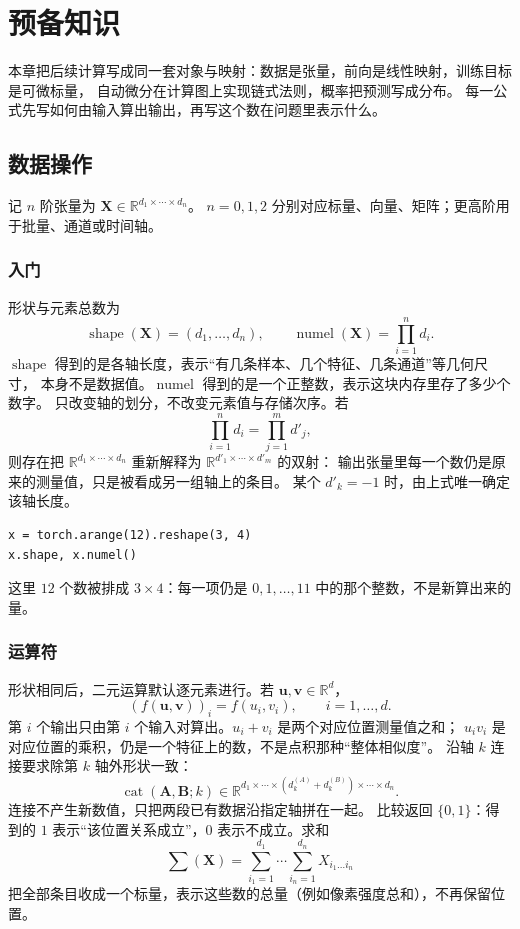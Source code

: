 \chapter{预备知识}

本章把后续计算写成同一套对象与映射：数据是张量，前向是线性映射，训练目标是可微标量，
自动微分在计算图上实现链式法则，概率把预测写成分布。
每一公式先写如何由输入算出输出，再写这个数在问题里表示什么。

\section{数据操作}

记 $n$ 阶张量为 $\bm{X}\in\mathbb{R}^{d_1\times\cdots\times d_n}$。
$n=0,1,2$ 分别对应标量、向量、矩阵；更高阶用于批量、通道或时间轴。

\subsection{入门}

形状与元素总数为
\[
\operatorname{shape}(\bm{X})=(d_1,\ldots,d_n),
\qquad
\operatorname{numel}(\bm{X})=\prod_{i=1}^{n}d_i.
\]
$\operatorname{shape}$ 得到的是各轴长度，表示“有几条样本、几个特征、几条通道”等几何尺寸，
本身不是数据值。$\operatorname{numel}$ 得到的是一个正整数，表示这块内存里存了多少个数字。
 只改变轴的划分，不改变元素值与存储次序。若
\[
\prod_{i=1}^{n}d_i=\prod_{j=1}^{m}d'_j,
\]
则存在把 $\mathbb{R}^{d_1\times\cdots\times d_n}$ 重新解释为 $\mathbb{R}^{d'_1\times\cdots\times d'_m}$ 的双射：
输出张量里每一个数仍是原来的测量值，只是被看成另一组轴上的条目。
某个 $d'_k=-1$ 时，由上式唯一确定该轴长度。

\begin{lstlisting}
x = torch.arange(12).reshape(3, 4)
x.shape, x.numel()
\end{lstlisting}
这里 $12$ 个数被排成 $3\times 4$：每一项仍是 $0,1,\ldots,11$ 中的那个整数，不是新算出来的量。

\subsection{运算符}

形状相同后，二元运算默认逐元素进行。若 $\bm{u},\bm{v}\in\mathbb{R}^{d}$，
\[
(f(\bm{u},\bm{v}))_i=f(u_i,v_i),\qquad i=1,\ldots,d.
\]
第 $i$ 个输出只由第 $i$ 个输入对算出。$u_i+v_i$ 是两个对应位置测量值之和；
$u_i v_i$ 是对应位置的乘积，仍是一个特征上的数，不是点积那种“整体相似度”。
沿轴 $k$ 连接要求除第 $k$ 轴外形状一致：
\[
\operatorname{cat}(\bm{A},\bm{B};k)
\in
\mathbb{R}^{d_1\times\cdots\times(d_k^{(A)}+d_k^{(B)})\times\cdots\times d_n}.
\]
连接不产生新数值，只把两段已有数据沿指定轴拼在一起。
比较返回 $\{0,1\}$：得到的 $1$ 表示“该位置关系成立”，$0$ 表示不成立。求和
\[
\sum(\bm{X})=\sum_{i_1=1}^{d_1}\cdots\sum_{i_n=1}^{d_n}X_{i_1\ldots i_n}
\]
把全部条目收成一个标量，表示这些数的总量（例如像素强度总和），不再保留位置。

